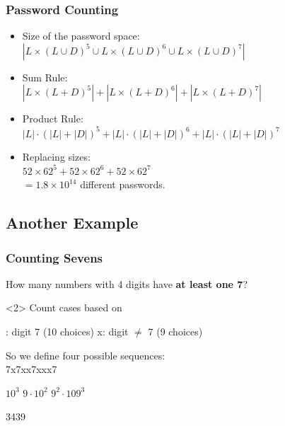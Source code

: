 \documentclass{beamer}
\begin{document}
\begin{frame}
  \frametitle{Password Counting}

  {\larger

    \begin{itemize}
    \item Size of the password space: $|L\times(L\cup D)^5 \cup
      L\times(L\cup D)^6 \cup L\times(L\cup D)^7|$

      \bigskip
      
    \item Sum Rule:\\
      $|L\times(L + D)^5| + |L\times(L + D)^6| +  |L\times(L + D)^7|$

      \bigskip
      
    \item Product Rule:\\
      $|L|\cdot(|L| + |D|)^5 + |L|\cdot(|L| + |D|)^6 +  |L|\cdot(|L| + |D|)^7$

      \bigskip
      
    \item Replacing sizes:\\
      $52\times62^5+52\times62^6+52\times62^7$ \\
      \hfill$= 1.8\times10^{14}$ different passwords.
    \end{itemize}

  }
\end{frame}

\subsection{Another Example}

\begin{frame}
  \frametitle{Counting Sevens}

  {\larger
    How many numbers with 4 digits have {\bf at least one 7}?

    \bigskip

    \begin{onlyenv}<2>
    Count cases based on 

    \bigskip

    : digit  7 (10 choices) \hfill \alert{x}:
    digit $\neq$ 7 (9 choices)

    \bigskip

    So we define four possible sequences:\\
    7\hfill\alert{x}7\hfill\alert{xx}7\hfill\alert{xxx}7

$10^3$ \hfill $9\cdot10^2$ \hfill $9^2\cdot10$\hfill $9^3$
    
    \bigskip

    \begin{center}
      3439
    \end{center}
    \end{onlyenv}
  }
\end{frame}
\end{document}
